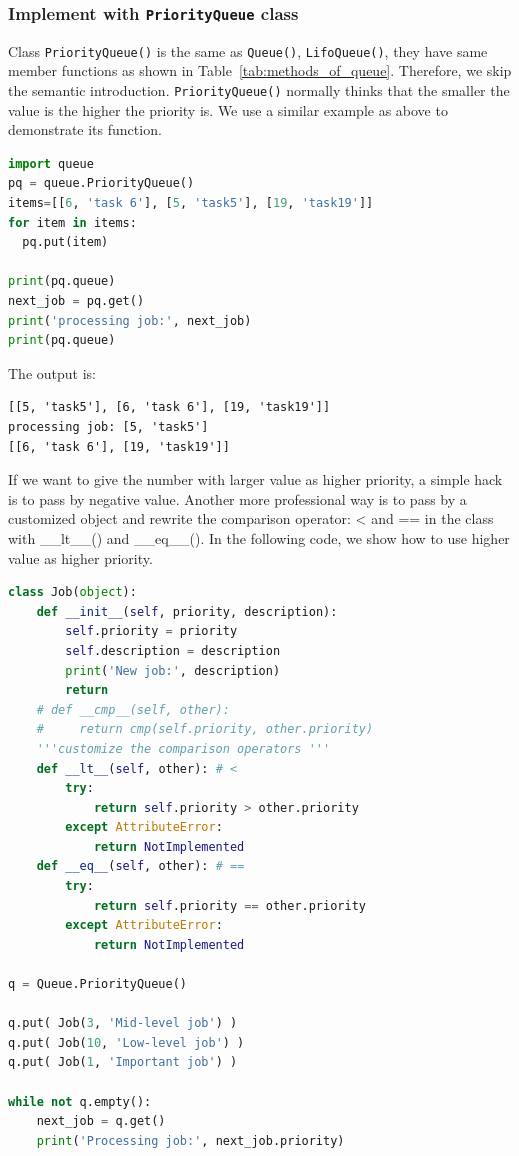 \documentclass[main.tex]{subfiles}
\begin{document}
\subsubsection{Implement with \texttt{PriorityQueue} class} Class \texttt{PriorityQueue()} is the same as \texttt{Queue()}, \texttt{LifoQueue()}, they have same member functions as shown in Table~\ref{tab:methods_of_queue}. Therefore, we skip the semantic introduction. \texttt{PriorityQueue()} normally thinks that the smaller the value is the higher the priority is. We use a similar example as above to demonstrate its function. 
\begin{lstlisting}[language=Python]
import queue
pq = queue.PriorityQueue()
items=[[6, 'task 6'], [5, 'task5'], [19, 'task19']]
for item in items:
  pq.put(item)

print(pq.queue)
next_job = pq.get()
print('processing job:', next_job)
print(pq.queue)
\end{lstlisting}
The output is:
\begin{lstlisting}
[[5, 'task5'], [6, 'task 6'], [19, 'task19']]
processing job: [5, 'task5']
[[6, 'task 6'], [19, 'task19']]
\end{lstlisting}
If we want to give the number with larger value as higher priority, a simple hack is to pass by negative value. Another more professional way is to pass by a customized object and rewrite the comparison operator: < and == in the class with \_\_lt\_\_() and \_\_eq\_\_(). In the following code, we show how to use higher value as higher priority. 
\begin{lstlisting}[language = Python]
class Job(object):
    def __init__(self, priority, description):
        self.priority = priority
        self.description = description
        print('New job:', description)
        return
    # def __cmp__(self, other):
    #     return cmp(self.priority, other.priority)
    '''customize the comparison operators '''
    def __lt__(self, other): # <
        try:
            return self.priority > other.priority
        except AttributeError:
            return NotImplemented
    def __eq__(self, other): # ==
        try:
            return self.priority == other.priority
        except AttributeError:
            return NotImplemented

q = Queue.PriorityQueue()

q.put( Job(3, 'Mid-level job') )
q.put( Job(10, 'Low-level job') )
q.put( Job(1, 'Important job') )

while not q.empty():
    next_job = q.get()
    print('Processing job:', next_job.priority)
\end{lstlisting}
\end{document}
